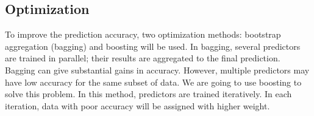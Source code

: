 \subsection{Optimization}

To improve the prediction accuracy, two optimization methods: bootstrap
aggregation (bagging) and boosting will be used. In bagging, several predictors
are trained in parallel; their results are aggregated to the final prediction.
Bagging can give substantial gains in accuracy. However, multiple predictors may
have low accuracy for the same subset of data. We are going to use boosting to
solve this problem. In this method, predictors are trained iteratively. In each
iteration, data with poor accuracy will be assigned with higher weight.